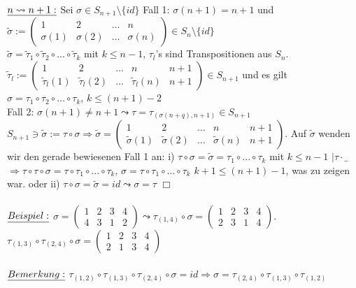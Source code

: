 \documentclass[fleqn, a4paper, 11pt]{scrartcl}
\theoremstyle{definition}
\begin{document}
$\uline{n\leadsto n+1:}$ Sei $\sigma\in S_{n+1}\setminus\{id\}$ Fall 1: $\sigma(n+1)=n+1$ und $\tilde{\sigma}:=\begin{pmatrix}
	1 & 2 & \dots & n\\
	\sigma(1) & \sigma(2) & \dots & \sigma(n)
\end{pmatrix}\in S_n\setminus\{id\}$\\
$\tilde{\sigma}=\tilde{\tau}_1\circ\tilde{\tau}_2\circ...\circ\tilde{\tau}_k$ mit $k\leq n-1$, $\tau_l$'s sind Transpositionen aus $S_n$. $\tilde{\tau}_l:=\begin{pmatrix}
	1 & 2 & \dots & n & n+1\\
	\tilde{\tau}_l (1) & \tilde{\tau}_l (2) & \dots & \tilde{\tau}_l (n) & n+1
\end{pmatrix}\in S_{n+1}$ und es gilt $\sigma=\tau_1\circ\tau_2\circ\dots\circ\tau_k$, $k\leq(n+1)-2$\\
Fall 2: $\sigma(n+1)\neq n+1\leadsto\tau=\tau_{(\sigma(n+q),n+1)}\in S_{n+1}$\\
$S_{n+1}\ni\tilde{\sigma}:=\tau\circ\sigma\Rightarrow\tilde{\sigma}=\begin{pmatrix}
	1 & 2 & \dots & n & n+1\\
	\tilde{\sigma}(1) & \tilde{\sigma}(2) & \dots & \tilde{\sigma}(n) & n+1
\end{pmatrix}$. Auf $\tilde{\sigma}$ wenden wir den gerade bewiesenen Fall 1 an: i) $\tau\circ\sigma=\tilde{\sigma}=\tau_1\circ...\circ\tau_k$ mit $k\leq n-1$ $|\tau\cdot \_$ $\Rightarrow \tau\circ\tau\circ\sigma=\tau\circ\tau_1\circ...\circ\tau_k$, $\sigma=\tau\circ\tau_1\circ...\circ\tau_k$ $k+1\leq (n+1)-1$, was zu zeigen war.
oder ii) $\tau\circ\sigma=\tilde{\sigma}=id\leadsto \sigma=\tau$ \hfill $\Box$\\
\\
$\uline{Beispiel:}$ $\sigma=\begin{pmatrix}
	1 & 2 & 3 & 4\\
	4 & 3 & 1 & 2
\end{pmatrix}\leadsto\tau_{(1,4)}\circ\sigma=\begin{pmatrix}
	1 & 2 & 3 & 4\\
	2 & 3 & 1 & 4
\end{pmatrix}$. $\tau_{(1,3)}\circ\tau_{(2,4)}\circ\sigma=\begin{pmatrix}
	1 & 2 & 3 & 4\\
	2 & 1 & 3 & 4
\end{pmatrix}$\\
\\
$\uline{Bemerkung:}$ $\tau_{(1,2)}\circ\tau_{(1,3)}\circ\tau_{(2,4)}\circ\sigma=id\Rightarrow \sigma=\tau_{(2,4)}\circ\tau_{(1,3)}\circ\tau_{(1,2)}$\\
\end{document}
